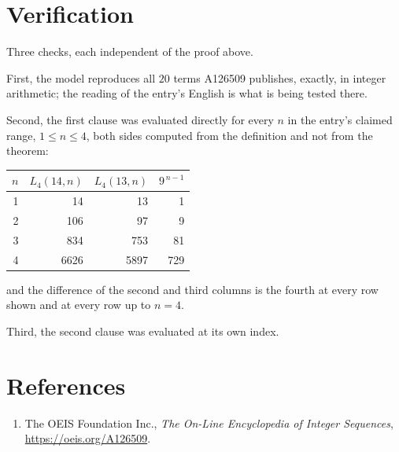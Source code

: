 \documentclass[11pt,a4paper]{article}
\theoremstyle{plain}
\theoremstyle{definition}
\begin{document}
\section{Verification}

Three checks, each independent of the proof above.

First, the model reproduces all $20$ terms A126509 publishes, exactly, in integer
arithmetic; the reading of the entry's English is what is being tested there.

Second, the first clause was evaluated directly for every $n$ in the entry's claimed range,
$1\le n\le4$, both sides computed from the definition and not from the theorem:

\begin{center}
\begin{tabular}{rrrr}
$n$ & $L_{4}(14,n)$ & $L_{4}(13,n)$ & $9^{\,n-1}$ \\ \hline
1 & 14 & 13 & 1 \\
2 & 106 & 97 & 9 \\
3 & 834 & 753 & 81 \\
4 & 6626 & 5897 & 729 \\
\end{tabular}
\end{center}

\noindent and the difference of the second and third columns is the fourth at every row shown
and at every row up to $n=4$.

Third, the second clause was evaluated at its own index.

\section*{References}
\begin{enumerate}
\item The OEIS Foundation Inc., \emph{The On-Line Encyclopedia of Integer Sequences},
\url{https://oeis.org/A126509}.
\end{enumerate}
\end{document}

